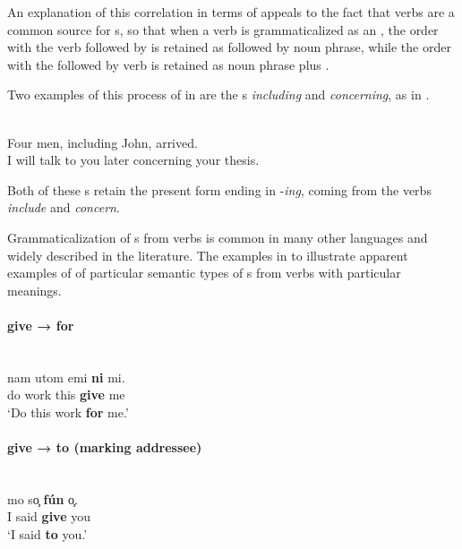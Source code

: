 \documentclass[output=paper]{langsci/langscibook}
\begin{document}
\newpage An explanation of this correlation in terms of  appeals to the fact that verbs are a common source for s, so that when a verb is grammaticalized as an , the order with the verb followed by  is retained as  followed by noun phrase, while the order with the  followed by verb is retained as noun phrase plus .

Two examples of this process of  in  are the s \textit{including} and \textit{concerning}, as in .

\ea\label{ex:dryer:1}
{}\\
\ea  Four men, including John, arrived.\\
\ex  I will talk to you later concerning your thesis.\\
\z
\z

\noindent Both of these s retain the present  form ending in -\textit{ing}, coming from the verbs \textit{include} and \textit{concern}. 

Grammaticalization of s from verbs is common in many other languages and widely described in the literature. The examples in  to  illustrate apparent examples of  of particular semantic types of s from verbs with particular meanings.

\paragraph*{give → for}

\ea\label{ex:dryer:2}
\\
\gll   nam  utom  emi  \textbf{ni}  mi.\\
       do  work  this  \textbf{give}  me\\
\glt   ‘Do this work \textbf{for} me.’
\z

\paragraph*{give → to (marking addressee)}

\ea\label{ex:dryer:3}
\\
\gll   mo  so̧ \textbf{fún}  o̧.\\
       I  said \textbf{give}  you\\
\glt   ‘I said \textbf{to} you.’
\z
\end{document}
